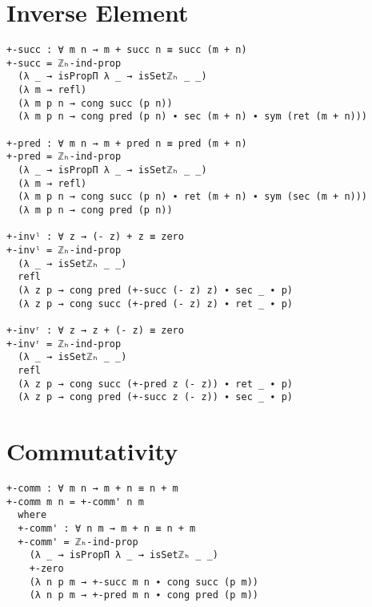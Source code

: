 \section{Inverse Element}
\begin{verbatim}
+-succ : ∀ m n → m + succ n ≡ succ (m + n)
+-succ = ℤₕ-ind-prop
  (λ _ → isPropΠ λ _ → isSetℤₕ _ _)
  (λ m → refl)
  (λ m p n → cong succ (p n))
  (λ m p n → cong pred (p n) ∙ sec (m + n) ∙ sym (ret (m + n)))

+-pred : ∀ m n → m + pred n ≡ pred (m + n)
+-pred = ℤₕ-ind-prop
  (λ _ → isPropΠ λ _ → isSetℤₕ _ _)
  (λ m → refl)
  (λ m p n → cong succ (p n) ∙ ret (m + n) ∙ sym (sec (m + n)))
  (λ m p n → cong pred (p n))

+-invˡ : ∀ z → (- z) + z ≡ zero
+-invˡ = ℤₕ-ind-prop
  (λ _ → isSetℤₕ _ _)
  refl
  (λ z p → cong pred (+-succ (- z) z) ∙ sec _ ∙ p)
  (λ z p → cong succ (+-pred (- z) z) ∙ ret _ ∙ p)

+-invʳ : ∀ z → z + (- z) ≡ zero
+-invʳ = ℤₕ-ind-prop
  (λ _ → isSetℤₕ _ _)
  refl
  (λ z p → cong succ (+-pred z (- z)) ∙ ret _ ∙ p)
  (λ z p → cong pred (+-succ z (- z)) ∙ sec _ ∙ p)
\end{verbatim}

\section{Commutativity}
\begin{verbatim}
+-comm : ∀ m n → m + n ≡ n + m
+-comm m n = +-comm' n m
  where
  +-comm' : ∀ n m → m + n ≡ n + m
  +-comm' = ℤₕ-ind-prop
    (λ _ → isPropΠ λ _ → isSetℤₕ _ _)
    +-zero
    (λ n p m → +-succ m n ∙ cong succ (p m))
    (λ n p m → +-pred m n ∙ cong pred (p m))
\end{verbatim}
